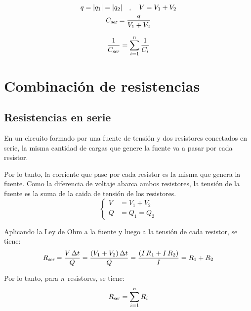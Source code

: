 \documentclass[a5paper,12pt,twoside]{book}
\begin{document}
\begin{gather*}
    q = {\left| {q_1} \right|} = {\left| {q_2} \right|} \quad , \quad V = V_1 + V_2
    \\
    {{C}_\textsl{{ser}}} = \frac{q}{V_1 + V_2}
\end{gather*}

\begin{equation*}
    \frac{1}{{{C}_\textsl{{ser}}}} = \sum_{i=1}^n \frac{1}{C_i}
\end{equation*}


\section{Combinación de resistencias}


\subsection*{Resistencias en serie}

En un circuito formado por una fuente de tensión y dos resistores conectados en serie, la misma cantidad de cargas que genere la fuente va a pasar por cada resistor.

\begin{center}
    \def\svgwidth{0.5\linewidth}
    
\end{center}

Por lo tanto, la corriente que pase por cada resistor es la misma que genera la fuente. Como la diferencia de voltaje abarca ambos resistores, la tensión de la fuente es la suma de la caida de tensión de los resistores.
\begin{equation*}
    \left\{
    \begin{aligned}
        V &= V_1 + V_2
        \\
        Q &= Q_1 = Q_2
    \end{aligned}
    \right.
\end{equation*}

Aplicando la Ley de Ohm a la fuente y luego a la tensión de cada resistor, se tiene:
\begin{equation*}
    {{R}_\textsl{{ser}}} = \frac{V \, \Delta t}{Q} = \frac{\left(V_1 + V_2\right) \Delta t}{Q} = \frac{\left(I \, R_1 + I \, R_2\right)}{I} = R_1 + R_2
\end{equation*}

Por lo tanto, para $n$ resistores, se tiene:
\begin{equation*}
    {{R}_\textsl{{ser}}} = \sum_{i=1}^n R_i
\end{equation*}
\end{document}
